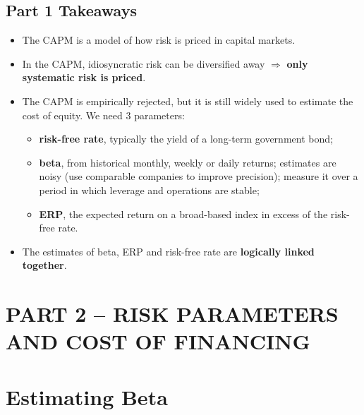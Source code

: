 \subsection{Part 1 Takeaways}
\begin{itemize}
  \item The CAPM is a model of how risk is priced in capital markets.
  \item In the CAPM, idiosyncratic risk can be diversified away $\Rightarrow$ \textbf{only systematic risk is priced}.
  \item The CAPM is empirically rejected, but it is still widely used to estimate the cost of equity. We need 3 parameters:
  \begin{itemize}
    \item \textbf{risk-free rate}, typically the yield of a long-term government bond;
    \item \textbf{beta}, from historical monthly, weekly or daily returns; estimates are noisy (use comparable companies to improve precision); measure it over a period in which leverage and operations are stable;
    \item \textbf{ERP}, the expected return on a broad-based index in excess of the risk-free rate.
  \end{itemize}
  \item The estimates of beta, ERP and risk-free rate are \textbf{logically linked together}.
\end{itemize}

\section*{PART 2 -- RISK PARAMETERS AND COST OF FINANCING}

\section{Estimating Beta}

